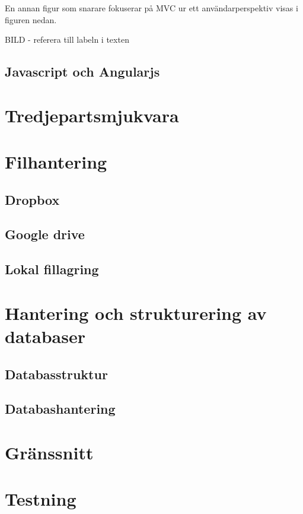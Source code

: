 \documentclass[a4paper,12pt,oneside,final]{extbook}
\begin{document}
En annan figur som snarare fokuserar på MVC ur ett användarperspektiv visas i figuren nedan.

BILD - referera till labeln i texten

\subsection{Javascript och Angularjs}

\section{Tredjepartsmjukvara}

\section{Filhantering}

\subsection{Dropbox}

\subsection{Google drive}

\subsection{Lokal fillagring}

\section{Hantering och strukturering av databaser}

\subsection{Databasstruktur}

\subsection{Databashantering}

\section{Gränssnitt}

\section{Testning}
\end{document}
